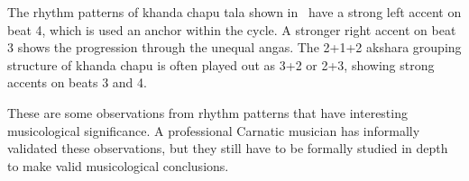 The rhythm patterns of \gls{khanda chapu} \gls{tala} shown in \ have a strong left accent on beat 4, which is used an anchor within the cycle. A stronger right accent on beat 3 shows the progression through the unequal \glspl{anga}. The 2+1+2 \gls{akshara} grouping structure of \gls{khanda chapu} is often played out as 3+2 or 2+3, showing strong accents on beats 3 and 4. 

These are some observations from rhythm patterns that have interesting musicological significance. A professional Carnatic musician has informally validated these observations, but they still have to be formally studied in depth to make valid musicological conclusions. 
%
%
%
